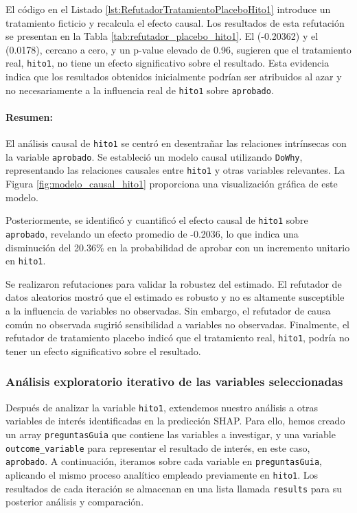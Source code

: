 El código en el Listado \ref{lst:RefutadorTratamientoPlaceboHito1} introduce un tratamiento ficticio y recalcula el efecto causal. Los resultados de esta refutación se presentan en la Tabla \ref{tab:refutador_placebo_hito1}. El  (-0.20362) y el  (0.0178), cercano a cero, y un p-value elevado de 0.96, sugieren que el tratamiento real, \texttt{hito1}, no tiene un efecto significativo sobre el resultado. Esta evidencia indica que los resultados obtenidos inicialmente podrían ser atribuidos al azar y no necesariamente a la influencia real de \texttt{hito1} sobre \texttt{aprobado}.

\paragraph{Resumen:} El análisis causal de \texttt{hito1} se centró en desentrañar las relaciones intrínsecas con la variable \texttt{aprobado}. Se estableció un modelo causal utilizando \texttt{DoWhy}, representando las relaciones causales entre \texttt{hito1} y otras variables relevantes. La Figura \ref{fig:modelo_causal_hito1} proporciona una visualización gráfica de este modelo.

Posteriormente, se identificó y cuantificó el efecto causal de \texttt{hito1} sobre \texttt{aprobado}, revelando un efecto promedio de -0.2036, lo que indica una disminución del 20.36\% en la probabilidad de aprobar con un incremento unitario en \texttt{hito1}.

Se realizaron refutaciones para validar la robustez del estimado. El refutador de datos aleatorios mostró que el estimado es robusto y no es altamente susceptible a la influencia de variables no observadas. Sin embargo, el refutador de causa común no observada sugirió sensibilidad a variables no observadas. Finalmente, el refutador de tratamiento placebo indicó que el tratamiento real, \texttt{hito1}, podría no tener un efecto significativo sobre el resultado.


\subsubsection{Análisis exploratorio iterativo de las variables seleccionadas}
Después de analizar la variable \texttt{hito1}, extendemos nuestro análisis a otras variables de interés identificadas en la predicción SHAP. Para ello, hemos creado un array \texttt{preguntasGuia} que contiene las variables a investigar, y una variable \texttt{outcome\_variable} para representar el resultado de interés, en este caso, \texttt{aprobado}. A continuación, iteramos sobre cada variable en \texttt{preguntasGuia}, aplicando el mismo proceso analítico empleado previamente en \texttt{hito1}. Los resultados de cada iteración se almacenan en una lista llamada \texttt{results} para su posterior análisis y comparación.

